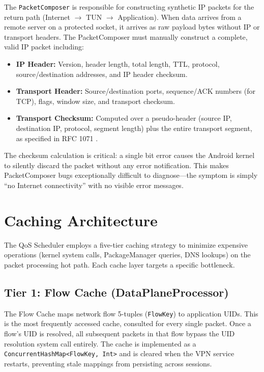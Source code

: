The \texttt{PacketComposer} is responsible for constructing synthetic IP packets for the return path (Internet $\rightarrow$ TUN $\rightarrow$ Application). When data arrives from a remote server on a protected socket, it arrives as raw payload bytes without IP or transport headers. The PacketComposer must manually construct a complete, valid IP packet including:

\begin{itemize}[noitemsep]
    \item \textbf{IP Header:} Version, header length, total length, TTL, protocol, source/destination addresses, and IP header checksum.
    \item \textbf{Transport Header:} Source/destination ports, sequence/ACK numbers (for TCP), flags, window size, and transport checksum.
    \item \textbf{Transport Checksum:} Computed over a pseudo-header (source IP, destination IP, protocol, segment length) plus the entire transport segment, as specified in RFC 1071 \cite{rfc1071}.
\end{itemize}

The checksum calculation is critical: a single bit error causes the Android kernel to silently discard the packet without any error notification. This makes PacketComposer bugs exceptionally difficult to diagnose---the symptom is simply ``no Internet connectivity'' with no visible error messages.

\section{Caching Architecture}
\label{sec:caching}

The QoS Scheduler employs a five-tier caching strategy to minimize expensive operations (kernel system calls, PackageManager queries, DNS lookups) on the packet processing hot path. Each cache layer targets a specific bottleneck.

\subsection{Tier 1: Flow Cache (DataPlaneProcessor)}

The Flow Cache maps network flow 5-tuples (\texttt{FlowKey}) to application UIDs. This is the most frequently accessed cache, consulted for every single packet. Once a flow's UID is resolved, all subsequent packets in that flow bypass the UID resolution system call entirely. The cache is implemented as a \texttt{ConcurrentHashMap<FlowKey, Int>} and is cleared when the VPN service restarts, preventing stale mappings from persisting across sessions.

